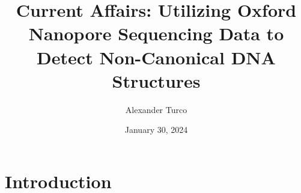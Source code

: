 \documentclass{beamer}
\title[BEAP Dec 2022]{Current Affairs: Utilizing Oxford Nanopore Sequencing Data to Detect Non-Canonical DNA Structures}
\author{Alexander Turco}
\date{January 30, 2024}
\begin{document}
	
	\section{Introduction}
	\begin{frame}
		\titlepage 
		\begin{center}
		\end{center}
	\end{frame}
	
	\logo{}
	
		
				

	
	
\end{document}
